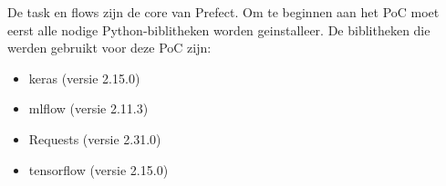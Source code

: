 De task en flows zijn de core van Prefect. Om te beginnen aan het PoC moet eerst alle nodige Python-biblitheken worden geinstalleer.
De biblitheken die werden gebruikt voor deze PoC zijn:
\begin{itemize}
    \item keras (versie 2.15.0)
    \item mlflow (versie 2.11.3)
    \item Requests (versie 2.31.0)
    \item tensorflow (versie 2.15.0)
\end{itemize}











